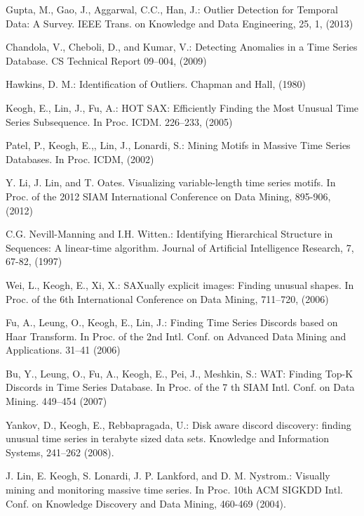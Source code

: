 \documentclass{llncs}
\begin{document}
\begin{thebibliography}{4}

Gupta, M., Gao, J., Aggarwal, C.C., Han, J.:
Outlier Detection for Temporal Data: A Survey.
IEEE Trans. on Knowledge and Data Engineering, 25, 1, (2013)

 Chandola, V., Cheboli, D., and Kumar, V.:
Detecting Anomalies in a Time Series Database.
CS Technical Report 09--004, (2009)

 Hawkins, D. M.: 
Identification of Outliers. Chapman and Hall, (1980)

Keogh, E., Lin, J., Fu, A.:
HOT SAX: Efficiently Finding the Most Unusual Time Series Subsequence. 
In Proc. ICDM. 226--233, (2005)

Patel, P., Keogh, E.,, Lin, J., Lonardi, S.:
Mining Motifs in Massive Time Series Databases. 
In Proc. ICDM, (2002)

Y. Li, J. Lin, and T. Oates. 
Visualizing variable-length time series motifs. 
In Proc. of the 2012 SIAM International Conference on Data Mining, 895-906, (2012)

C.G. Nevill-Manning and I.H. Witten.:
Identifying Hierarchical Structure in Sequences: A linear-time algorithm. 
Journal of Artificial Intelligence Research, 7, 67-82, (1997)

Wei, L., Keogh, E., Xi, X.: 
SAXually explicit images: Finding unusual shapes.
In Proc. of the 6th International Conference on Data Mining, 711--720, (2006)

Fu, A., Leung, O., Keogh, E., Lin, J.:
Finding Time Series Discords based on Haar Transform.
In Proc. of the 2nd Intl. Conf. on Advanced Data Mining and Applications. 31--41 (2006)

Bu, Y., Leung, O., Fu, A., Keogh, E., Pei, J., Meshkin, S.:
WAT: Finding Top-K Discords in Time Series Database.
In Proc. of the 7 th SIAM Intl. Conf. on Data Mining. 449--454 (2007)

Yankov, D., Keogh, E., Rebbapragada, U.:
Disk aware discord discovery: finding unusual time series in terabyte sized data sets.
Knowledge and Information Systems, 241--262 (2008).

J. Lin, E. Keogh, S. Lonardi, J. P. Lankford, and D. M. Nystrom.:
Visually mining and monitoring massive time series. 
In Proc. 10th ACM SIGKDD Intl. Conf. on Knowledge Discovery and Data Mining, 460-469 (2004). 


\end{thebibliography}
\end{document}
